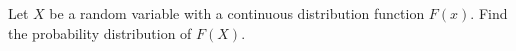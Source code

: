 Let $X$ be a random variable with a continuous distribution function $F(x)$. Find the probability distribution of $F(X)$.
